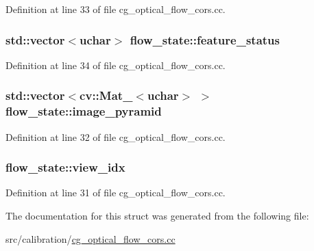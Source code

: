 Definition at line 33 of file cg\+\_\+optical\+\_\+flow\+\_\+cors.\+cc.

\subsubsection[{\texorpdfstring{feature\+\_\+status}{feature_status}}]{\setlength{\rightskip}{0pt plus 5cm}std\+::vector$<$uchar$>$ flow\+\_\+state\+::feature\+\_\+status}\hypertarget{structflow__state_afe1e6db4eac958ecc432ee6c20d4e2b5}{}\label{structflow__state_afe1e6db4eac958ecc432ee6c20d4e2b5}


Definition at line 34 of file cg\+\_\+optical\+\_\+flow\+\_\+cors.\+cc.

\subsubsection[{\texorpdfstring{image\+\_\+pyramid}{image_pyramid}}]{\setlength{\rightskip}{0pt plus 5cm}std\+::vector$<$cv\+::\+Mat\+\_\+$<$uchar$>$ $>$ flow\+\_\+state\+::image\+\_\+pyramid}\hypertarget{structflow__state_a83570bddb99be6487a926cab5735cff5}{}\label{structflow__state_a83570bddb99be6487a926cab5735cff5}


Definition at line 32 of file cg\+\_\+optical\+\_\+flow\+\_\+cors.\+cc.

\subsubsection[{\texorpdfstring{view\+\_\+idx}{view_idx}}]{ flow\+\_\+state\+::view\+\_\+idx}\hypertarget{structflow__state_acec6eb589835df528397b781483bf477}{}\label{structflow__state_acec6eb589835df528397b781483bf477}


Definition at line 31 of file cg\+\_\+optical\+\_\+flow\+\_\+cors.\+cc.



The documentation for this struct was generated from the following file\+:\begin{DoxyCompactItemize}
\item 
src/calibration/\hyperlink{cg__optical__flow__cors_8cc}{cg\+\_\+optical\+\_\+flow\+\_\+cors.\+cc}\end{DoxyCompactItemize}
